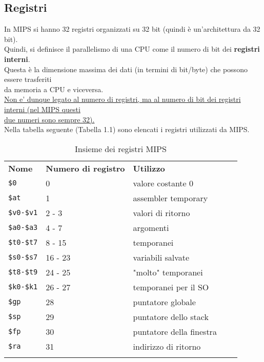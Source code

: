 \documentclass[../main.tex]{subfiles}
\begin{document}
\subsection{Registri}
In MIPS si hanno 32 registri organizzati su 32 bit (quindi è
un'architettura da 32 bit). \\
Quindi, si definisce il parallelismo di una CPU come il numero di bit
dei \textbf{registri interni}. \\
Questa è la dimensione massima dei dati (in termini
di bit/byte) che possono essere trasferiti \\ da memoria
a CPU e viceversa.
\\[1mm]
\underline{Non e' dunque legato al numero di registri, ma al numero di bit dei
registri interni (nel MIPS questi} \\ \underline{due numeri sono sempre 32).}
\\[3mm]
Nella tabella seguente (Tabella 1.1) sono elencati i registri utilizzati da MIPS.
\begin{table}[htb!]
    \centering
    
    \setlength{\tabcolsep}{12pt}
    \renewcommand{\arraystretch}{1.5}
    \begin{tabular}{ V{4} p{2cm} | p{4cm} | p{5cm} V{4}}
        { \textbf{Nome} } & { \textbf{Numero di registro} } & { \textbf{Utilizzo} } \\
        \texttt{\$0} & 0 & valore costante 0 \\
        \hline
        \texttt{\$at} & 1 & assembler temporary \\
        \hline
        \texttt{\$v0-\$v1} & 2 - 3 & valori di ritorno \\
        \hline
        \texttt{\$a0-\$a3} & 4 - 7 & argomenti \\
        \hline
        \texttt{\$t0-\$t7} & 8 - 15 & temporanei \\
        \hline
        \texttt{\$s0-\$s7} & 16 - 23 & variabili salvate \\
        \hline
        \texttt{\$t8-\$t9} & 24 - 25 & "molto" temporanei \\
        \hline
        \texttt{\$k0-\$k1} & 26 - 27 & temporanei per il SO \\
        \hline
        \texttt{\$gp} & 28 & puntatore globale \\
        \hline
        \texttt{\$sp} & 29 & puntatore dello stack \\
        \hline
        \texttt{\$fp} & 30 & puntatore della finestra \\
        \hline
        \texttt{\$ra} & 31 & indirizzo di ritorno \\
    \end{tabular}
    \caption{Insieme dei registri MIPS}
\end{table}
\end{document}

